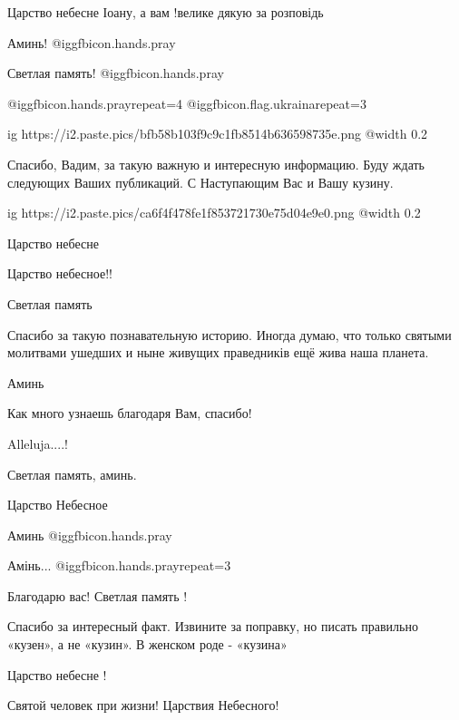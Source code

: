 \begin{itemize}
Царство небесне Іоану, а вам !велике дякую за розповідь

Аминь!  @igg{fbicon.hands.pray} 

Светлая память! @igg{fbicon.hands.pray} 

 @igg{fbicon.hands.pray}{repeat=4} @igg{fbicon.flag.ukraina}{repeat=3}


\ifcmt
  ig https://i2.paste.pics/bfb58b103f9c9c1fb8514b636598735e.png
  @width 0.2
\fi

Спасибо, Вадим, за такую важную и интересную информацию. Буду ждать следующих Ваших публикаций.
С Наступающим Вас и Вашу кузину.


\ifcmt
  ig https://i2.paste.pics/ca6f4f478fe1f853721730e75d04e9e0.png
  @width 0.2
\fi

Царство небесне

Царство небесное!!

Светлая память


Спасибо за такую познавательную историю. Иногда думаю, что только святыми
молитвами ушедших и ныне живущих праведників ещё жива наша планета.


Аминь

Как много узнаешь благодаря Вам, спасибо!

Alleluja....!

Светлая память, аминь.

Царство Небесное

Аминь @igg{fbicon.hands.pray} 

Амінь...  @igg{fbicon.hands.pray}{repeat=3} 

Благодарю вас! Светлая память !

Спасибо за интересный факт. Извините за поправку, но писать правильно «кузен», а не «кузин». В женском роде - «кузина»

Царство небесне !

Святой человек при жизни!
Царствия Небесного!


\end{itemize}
